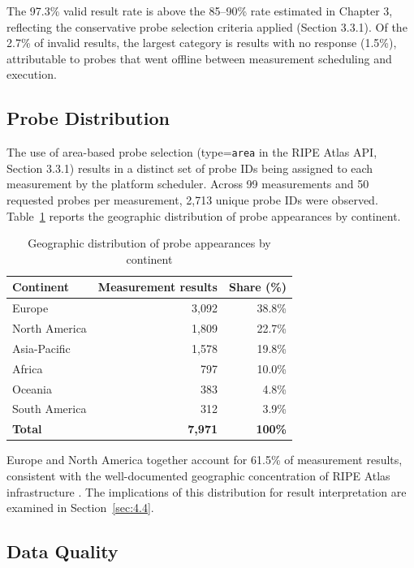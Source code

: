 The 97.3\% valid result rate is above the 85--90\% rate estimated in Chapter 3, reflecting the conservative probe selection criteria applied (Section 3.3.1). Of the 2.7\% of invalid results, the largest category is results with no response (1.5\%), attributable to probes that went offline between measurement scheduling and execution.

\subsection{Probe Distribution}
\label{subsec:4.1.2}

The use of area-based probe selection (type=\texttt{area} in the RIPE Atlas API, Section 3.3.1) results in a distinct set of probe IDs being assigned to each measurement by the platform scheduler. Across 99 measurements and 50 requested probes per measurement, 2,713 unique probe IDs were observed. Table~\ref{tab:4.2} reports the geographic distribution of probe appearances by continent.

\begin{table}[H]
\centering
\small
\caption{Geographic distribution of probe appearances by continent}
\label{tab:4.2}
\begin{tabular}{l r r}
\toprule
\textbf{Continent} & \textbf{Measurement results} & \textbf{Share (\%)} \\
\midrule
Europe          & 3,092 & 38.8\% \\
North America   & 1,809 & 22.7\% \\
Asia-Pacific    & 1,578 & 19.8\% \\
Africa          &   797 & 10.0\% \\
Oceania         &   383 &  4.8\% \\
South America   &   312 &  3.9\% \\
\textbf{Total}  & \textbf{7,971} & \textbf{100\%} \\
\bottomrule
\end{tabular}
\end{table}

Europe and North America together account for 61.5\% of measurement results, consistent with the well-documented geographic concentration of RIPE Atlas infrastructure \cite{Bajpai2015}. The implications of this distribution for result interpretation are examined in Section~\ref{sec:4.4}.

\subsection{Data Quality}
\label{subsec:4.1.3}

